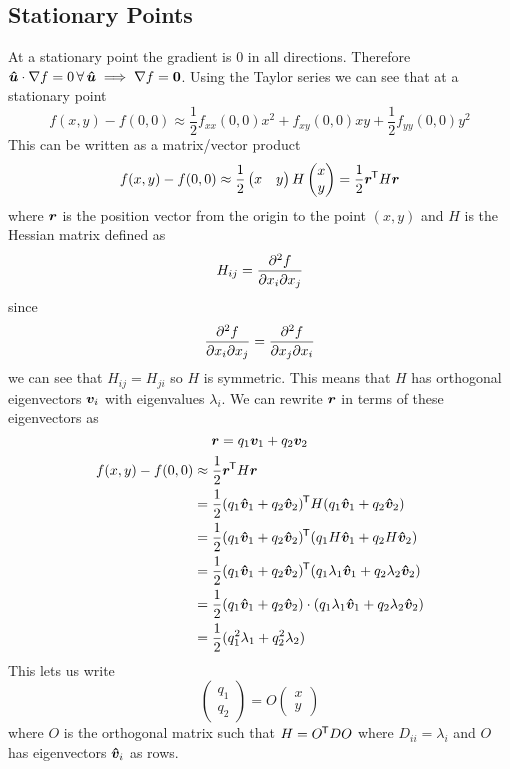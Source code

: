 \documentclass{article}
\renewcommand{\grad}{\nabla}
\begin{document}
    \subsection{Stationary Points}
    At a stationary point the gradient is 0 in all directions.
    Therefore \(\vh u\cdot \grad f = 0\A \vh u\implies\grad f = \vv 0\).
    Using the Taylor series we can see that at a stationary point
    \[f(x, y) - f(0, 0) \approx \frac{1}{2}f_{xx}(0, 0)x^2 + f_{xy}(0, 0)xy + \frac{1}{2}f_{yy}(0, 0)y^2\]
    This can be written as a matrix/vector product
    \[
        f(x, y) - f(0, 0) \approx \frac{1}{2}
        \begin{pmatrix}
            x & y
        \end{pmatrix}
        H
        \begin{pmatrix}
            x \\ y
        \end{pmatrix}
        = \frac{1}{2}\bm{r}^{\mkern-1.5mu\mathsf{T}} H \bm{r}
    \]
    where \(\bm{r}\) is the position vector from the origin to the point \((x, y)\) and \(H\) is the Hessian matrix defined as
    \[H_{ij} = \frac{\partial^2{f}}{\partial{x_i}\partial{x_j}}\]
    since
    \[\frac{\partial^2{f}}{\partial{x_i}\partial{x_j}} = \frac{\partial^2{f}}{\partial{x_j}\partial{x_i}}\]
    we can see that \(H_{ij} = H_{ji}\) so \(H\) is symmetric.
    This means that \(H\) has orthogonal eigenvectors \(\bm{v}_i\) with eigenvalues \(\lambda_i\).
    We can rewrite \(\bm{r}\) in terms of these eigenvectors as
    \[\bm{r} = q_1\bm{v}_1 + q_2\bm{v}_2\]
    \begin{align*}
    f(x, y) - f(0, 0) &\approx \frac{1}{2}\bm{r}^{\mkern-1.5mu\mathsf{T}} H\bm{r}\\
    &= \frac{1}{2}(q_1\bm{\hat{v}}_1 + q_2\bm{\hat{v}}_2)^{\mkern-1.5mu\mathsf{T}} H(q_1\bm{\hat{v}}_1 + q_2\bm{\hat{v}}_2)\\ 
    &= \frac{1}{2}(q_1\bm{\hat{v}}_1 + q_2\bm{\hat{v}}_2)^{\mkern-1.5mu\mathsf{T}}(q_1H\bm{\hat{v}}_1 + q_2H\bm{\hat{v}}_2)\\
    &= \frac{1}{2}(q_1\bm{\hat{v}}_1 + q_2\bm{\hat{v}}_2)^{\mkern-1.5mu\mathsf{T}}(q_1\lambda_1\bm{\hat{v}}_1 + q_2\lambda_2\bm{\hat{v}}_2)\\
    &= \frac{1}{2}(q_1\bm{\hat{v}}_1 + q_2\bm{\hat{v}}_2)\cdot(q_1\lambda_1\bm{\hat{v}}_1 + q_2\lambda_2\bm{\hat{v}}_2)\\
    &= \frac{1}{2}(q_1^2\lambda_1 + q_2^2\lambda_2)
    \end{align*}
    This lets us write
    \[
        \begin{pmatrix}
            q_1 \\ q_2
        \end{pmatrix}
        = O
        \begin{pmatrix}
            x \\ y
        \end{pmatrix}
    \]
    where \(O\) is the orthogonal matrix such that \(H = O^{\mkern-1.5mu\mathsf{T}} DO\) where \(D_{ii} = \lambda_i\) and \(O\) has eigenvectors \(\bm{\hat{v}}_i\) as rows.
    
\end{document}
